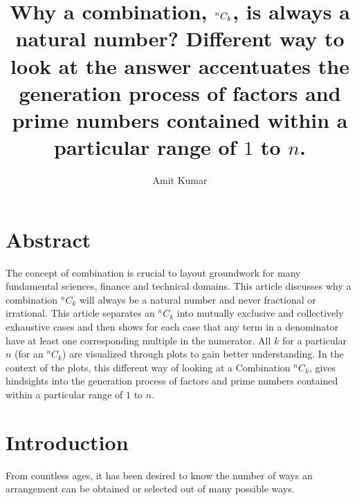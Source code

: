 \documentclass[10pt, twoside]{article}
\title{Why a combination, $\Combination{n}{k}$, is always a natural number? Different way to look at the answer accentuates the generation process of factors and prime numbers contained within a particular range of $1$ to $n$.}
\author{Amit Kumar}
\date{}
\newcommand*{\Combination}[2]{{}^{#1}C_{#2}}%
\begin{document}
	\maketitle
	\section{Abstract}
	 The concept of combination is crucial to layout groundwork for many fundamental sciences, finance and technical domains. This article discusses why a combination $\Combination{n}{k}$ will always be a natural number and never fractional or irrational. This article separates an $\Combination{n}{k}$ into mutually exclusive and collectively exhaustive cases and then shows for each case that any term in a denominator have at least one corresponding multiple in the numerator. All $k$ for a particular $n$ (for an $\Combination{n}{k}$) are visualized through plots to gain better understanding. In the context of the plots, this different way of looking at a Combination $\Combination{n}{k}$, gives hindsights into the generation process of factors and prime numbers contained within a particular range of $1$ to $n$.
	\section{Introduction}
	From countless ages, it has been desired to know the number of ways an arrangement can be obtained or selected out of many possible ways.
	
\end{document}
